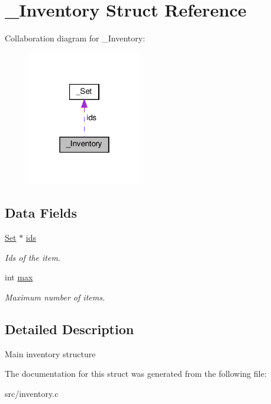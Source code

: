 \hypertarget{struct__Inventory}{}\section{\+\_\+\+Inventory Struct Reference}
\label{struct__Inventory}


Collaboration diagram for \+\_\+\+Inventory\+:
\nopagebreak
\begin{figure}[H]
\begin{center}
\leavevmode
\includegraphics[width=142pt]{struct__Inventory__coll__graph}
\end{center}
\end{figure}
\subsection*{Data Fields}
\begin{DoxyCompactItemize}
\item 
\mbox{\label{struct__Inventory_a7f6b5d7d1111e7e8f8999c656ae27d0c}} 
\hyperlink{struct__Set}{Set} $\ast$ \hyperlink{struct__Inventory_a7f6b5d7d1111e7e8f8999c656ae27d0c}{ids}
\begin{DoxyCompactList}\small\item\em Ids of the item. \end{DoxyCompactList}\item 
\mbox{\label{struct__Inventory_ac09bcf212b2c7ff348066b2e5f28bb9c}} 
int \hyperlink{struct__Inventory_ac09bcf212b2c7ff348066b2e5f28bb9c}{max}
\begin{DoxyCompactList}\small\item\em Maximum number of items. \end{DoxyCompactList}\end{DoxyCompactItemize}


\subsection{Detailed Description}
Main inventory structure 

The documentation for this struct was generated from the following file\+:\begin{DoxyCompactItemize}
\item 
src/inventory.\+c\end{DoxyCompactItemize}
